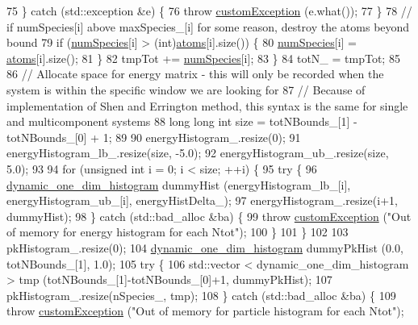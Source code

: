 \begin{DoxyCode}
75         \} \textcolor{keywordflow}{catch} (std::exception &e) \{
76             \textcolor{keywordflow}{throw} \hyperlink{classcustom_exception}{customException} (e.what());
77         \}
78         \textcolor{comment}{// if numSpecies[i] above maxSpecies\_[i] for some reason, destroy the atoms beyond bound}
79         \textcolor{keywordflow}{if} (\hyperlink{classsim_system_a9eea865e6dc1cff377b1e79c4d9c23f0}{numSpecies}[i] > (\textcolor{keywordtype}{int})\hyperlink{classsim_system_a90421b19082f7fb8fc23b7264b1161e4}{atoms}[i].size()) \{
80             \hyperlink{classsim_system_a9eea865e6dc1cff377b1e79c4d9c23f0}{numSpecies}[i] = \hyperlink{classsim_system_a90421b19082f7fb8fc23b7264b1161e4}{atoms}[i].size();
81         \}
82         tmpTot += \hyperlink{classsim_system_a9eea865e6dc1cff377b1e79c4d9c23f0}{numSpecies}[i];
83     \}
84     totN\_ = tmpTot;
85 
86     \textcolor{comment}{// Allocate space for energy matrix - this will only be recorded when the system is within the specific
       window we are looking for}
87     \textcolor{comment}{// Because of implementation of Shen and Errington method, this syntax is the same for single and
       multicomponent systems}
88     \textcolor{keywordtype}{long} \textcolor{keywordtype}{long} \textcolor{keywordtype}{int} size = totNBounds\_[1] - totNBounds\_[0] + 1;
89 
90     energyHistogram\_.resize(0);
91     energyHistogram\_lb\_.resize(size, -5.0);
92     energyHistogram\_ub\_.resize(size, 5.0);
93 
94     \textcolor{keywordflow}{for} (\textcolor{keywordtype}{unsigned} \textcolor{keywordtype}{int} i = 0; i < size; ++i) \{
95         \textcolor{keywordflow}{try} \{
96             \hyperlink{classdynamic__one__dim__histogram}{dynamic\_one\_dim\_histogram} dummyHist (energyHistogram\_lb\_[i], 
      energyHistogram\_ub\_[i], energyHistDelta\_);
97             energyHistogram\_.resize(i+1, dummyHist);
98         \} \textcolor{keywordflow}{catch} (std::bad\_alloc &ba) \{
99             \textcolor{keywordflow}{throw} \hyperlink{classcustom_exception}{customException} (\textcolor{stringliteral}{"Out of memory for energy histogram for each Ntot"});
100         \}
101     \}
102 
103     pkHistogram\_.resize(0);
104     \hyperlink{classdynamic__one__dim__histogram}{dynamic\_one\_dim\_histogram} dummyPkHist (0.0, totNBounds\_[1], 1.0);
105     \textcolor{keywordflow}{try} \{
106         std::vector < dynamic\_one\_dim\_histogram > tmp (totNBounds\_[1]-totNBounds\_[0]+1, dummyPkHist);
107         pkHistogram\_.resize(nSpecies\_, tmp);
108     \} \textcolor{keywordflow}{catch} (std::bad\_alloc &ba) \{
109         \textcolor{keywordflow}{throw} \hyperlink{classcustom_exception}{customException} (\textcolor{stringliteral}{"Out of memory for particle histogram for each Ntot"});

\end{DoxyCode}
